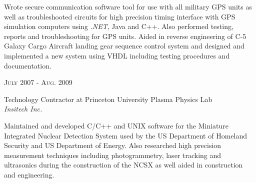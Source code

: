 \documentclass[10pt]{article} %
\begin{document}
{\begin{minipage}[t]{0.5\textwidth}
\small{Wrote secure communication software tool for use with all military GPS 
units as well as troubleshooted circuits for high precision timing interface 
with GPS simulation computers using \emph{.NET}, Java and C++. Also performed 
testing, reports and troubleshooting for GPS units. Aided in reverse 
engineering of C-5 Galaxy Cargo Aircraft landing gear sequence control system 
and designed and implemented a new system using VHDL including testing 
procedures and documentation.} \\


{\raggedleft\textsc{July 2007 - Aug. 2009}\par}

{\raggedright\large Technology Contractor at Princeton University Plasma Physics Lab\\
\textit{Insitech Inc.}\\[5pt]}

\small{Maintained and developed C/C++ and UNIX software for the Miniature Integrated Nuclear Detection System used by the US Department of Homeland Security and US Department of Energy. Also researched high precision measurement techniques including photogrammetry, laser tracking and ultrasonics during the construction of the NCSX as well aided in construction and engineering.
}\\


%
%


%
%


\end{minipage}}
\end{document}
